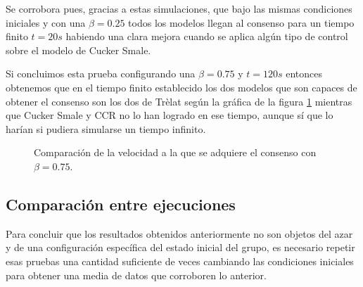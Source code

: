 Se corrobora pues, gracias a estas simulaciones, que bajo las mismas condiciones iniciales y con una $\beta = 0.25$ todos los modelos llegan al consenso para un tiempo finito $t=20s$ habiendo una clara mejora cuando se aplica algún tipo de control sobre el modelo de Cucker Smale.

Si concluimos esta prueba configurando una $\beta=0.75$ y $t=120s$ entonces obtenemos que en el tiempo finito establecido los dos modelos que son capaces de obtener el consenso son los dos de Trèlat según la gráfica de la figura \ref{fig:consenso_4models_b075} mientras que Cucker Smale y CCR no lo han logrado en ese tiempo, aunque sí que lo harían si pudiera simularse un tiempo infinito.

\begin{figure}[htbp]
\centering
\caption{Comparación de la velocidad a la que se adquiere el consenso con $\beta=0.75$.} 
\label{fig:consenso_4models_b075}
\end{figure}

\subsection{Comparación entre ejecuciones}

Para concluir que los resultados obtenidos anteriormente no son objetos del azar y de una configuración específica del estado inicial del grupo, es necesario repetir esas pruebas una cantidad suficiente de veces cambiando las condiciones iniciales para obtener una media de datos que corroboren lo anterior.

